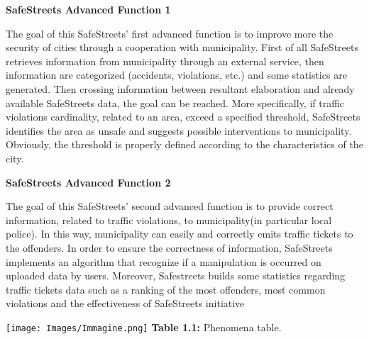 \documentclass[12pt]{article}
\begin{document}
\begin{flushleft}
\textbf{SafeStreets Advanced Function 1}
\end{flushleft}
\vspace{3mm}
The goal of this SafeStreets’ first advanced function is to improve more the security of cities through a cooperation with municipality. First of all SafeStreets retrieves information from municipality through an external service, then information are categorized (accidents, violations, etc.) and some statistics are generated. Then crossing information between resultant elaboration and already available SafeStreets data, the goal can be reached. More specifically, if traffic violations cardinality, related to an area, exceed a specified threshold, SafeStreets identifies the area as unsafe and suggests possible interventions to municipality. Obviously, the threshold is properly defined according to the characteristics of the city.

\newpage

\begin{flushleft}
\textbf{SafeStreets Advanced Function 2}
\end{flushleft}
\vspace{3mm}
The goal of this SafeStreets’ second advanced function is to provide correct information, related to traffic violations, to municipality(in particular local police). In this way, municipality can easily and correctly emits traffic tickets to the offenders. In order to ensure the correctness of information, SafeStreets implements an algorithm that recognize if a manipulation is occurred on uploaded data by users. Moreover, Safestreets builds some statistics regarding traffic tickets data such as a ranking of the most offenders, most common violations and the effectiveness of SafeStreets initiative
\vspace{4mm}
\begin{center}
	
	 	\vspace{4mm}
	 	
 	 	\texttt{[image: Images/Immagine.png]}
 	 	\textbf{Table 1.1:} Phenomena table.
	\end{center}


\newpage
\end{document}
